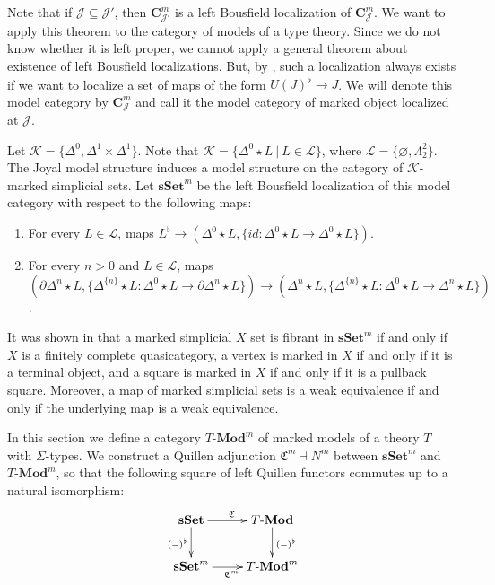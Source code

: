 \documentclass[reqno]{amsart}
\theoremstyle{definition}
\theoremstyle{remark}
\newcommand{\cat}[1]{\mathbf{#1}}
\newcommand{\C}{\cat{C}}
\newcommand{\Mod}[1]{#1\text{-}\cat{Mod}}
\newcommand{\sSet}{\cat{sSet}}
\newcommand{\K}{$\mathcal{K}$}
\newcommand{\join}{\star}
\numberwithin{figure}{section}
\begin{document}
Note that if $\mathcal{J} \subseteq \mathcal{J}'$, then $\C^m_{\mathcal{J}'}$ is a left Bousfield localization of $\C^m_\mathcal{J}$.
We want to apply this theorem to the category of models of a type theory.
Since we do not know whether it is left proper, we cannot apply a general theorem about existence of left Bousfield localizations.
But, by , such a localization always exists if we want to localize a set of maps of the form $U(J)^\flat \to J$.
We will denote this model category by $\C^m_\mathcal{J}$ and call it the model category of marked object localized at $\mathcal{J}$.

Let $\mathcal{K} = \{ \Delta^0, \Delta^1 \times \Delta^1 \}$.
Note that $\mathcal{K} = \{ \Delta^0 \join L\ |\ L \in \mathcal{L} \}$, where $\mathcal{L} = \{ \varnothing, \Lambda^2_2 \}$.
The Joyal model structure induces a model structure on the category of \K-marked simplicial sets.
Let $\sSet^m$ be the left Bousfield localization of this model category with respect to the following maps:
\begin{enumerate}
\item For every $L \in \mathcal{L}$, maps $L^\flat \to (\Delta^0 \join L, \{ id : \Delta^0 \join L \to \Delta^0 \join L \})$.
\item For every $n > 0$ and $L \in \mathcal{L}$, maps $(\partial \Delta^n \join L, \{ \Delta^{\{n\}} \join L : \Delta^0 \join L \to \partial \Delta^n \join L \}) \to (\Delta^n \join L, \{ \Delta^{\{n\}} \join L : \Delta^0 \join L \to \Delta^n \join L \})$.
\end{enumerate}

It was shown in \cite{marked-obj} that a marked simplicial $X$ set is fibrant in $\sSet^m$ if and only if
$X$ is a finitely complete quasicategory, a vertex is marked in $X$ if and only if it is a terminal object,
and a square is marked in $X$ if and only if it is a pullback square.
Moreover, a map of marked simplicial sets is a weak equivalence if and only if the underlying map is a weak equivalence.

In this section we define a category $\Mod{T}^m$ of marked models of a theory $T$ with $\Sigma$-types.
We construct a Quillen adjunction $\mathfrak{C}^m \dashv N^m$ between $\sSet^m$ and $\Mod{T}^m$,
so that the following square of left Quillen functors commutes up to a natural isomorphism:
\[ \xymatrix{ \sSet \ar[d]_{(-)^\flat} \ar[r]^{\mathfrak{C}} & \Mod{T} \ar[d]^{(-)^\flat} \\
              \sSet^m \ar[r]_{\mathfrak{C}^m}                & \Mod{T}^m
            } \]
\end{document}
